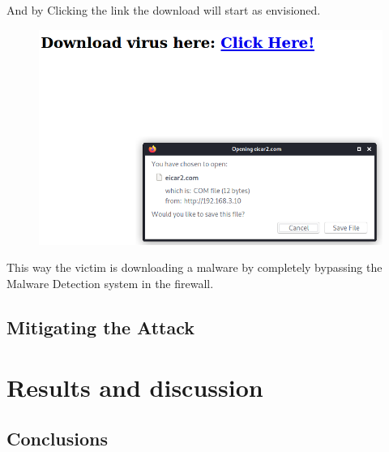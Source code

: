 And by Clicking the link the download will start as envisioned.

\begin{figure}[h!]
 \centering
 \includegraphics[width=13cm]{img/after_proxy.png}
\end{figure}

This way the victim is downloading a malware by completely bypassing the Malware Detection system in the firewall.


\newpage

\section{Mitigating the Attack}


\chapter{Results and discussion}
\section{Conclusions}

\newpage
\cleardoublepage



\newpage
\cleardoublepage
\listoffigures%





